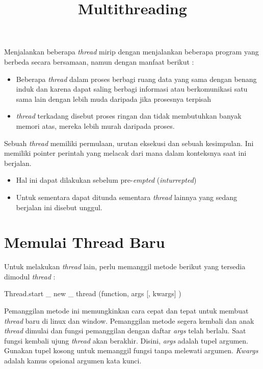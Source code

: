\documentclass [12pt,a4paper,notitlepage,oneside,bahasa]{article}
\begin{document}
\title{\textbf Multithreading}
\maketitle

Menjalankan beberapa\textit{ thread} mirip dengan menjalankan beberapa program yang berbeda secara bersamaan, namun dengan manfaat berikut :
\begin{itemize}
	\item Beberapa \textit{thread} dalam proses berbagi ruang data yang sama dengan benang induk dan karena dapat saling berbagi informasi atau berkomunikasi satu sama lain dengan lebih muda daripada jika prosesnya terpisah \par
	\item \textit{thread} terkadang disebut proses ringan dan tidak membutuhkan banyak memori atas, mereka lebih murah daripada proses.
\end{itemize}

Sebuah \textit{thread} memiliki permulaan, urutan eksekusi dan sebuah kesimpulan. Ini memiliki pointer perintah yang melacak dari mana dalam konteksnya saat ini berjalan. \par
\begin{itemize}
	\item Hal ini dapat dilakukan sebelum pre-\textit{empted} (\textit{inturrepted})
	\item Untuk sementara dapat ditunda sementara \textit{thread} lainnya yang sedang berjalan ini disebut unggul. 
\end{itemize}
\noindent 
\section{Memulai Thread Baru}
\noindent 
\hspace*{0.5in} Untuk melakukan \textit{thread} lain, perlu memanggil metode berikut yang tersedia dimodul \textit{thread} :
\noindent 
\begin{center}{\fontsize{9pt}{9pt}\selectfont Thread.start  \_  new   \_  thread (function, args [, kwargs] )}\end{center}
Pemanggilan metode ini memungkinkan cara cepat dan tepat untuk membuat \textit{thread} baru di linux dan window.
Pemanggilan metode segera kembali dan anak  \textit{thread} dimulai dan fungsi pemanggilan dengan daftar \textit{args} telah berlalu. Saat fungsi kembali ujung \textit{thread} akan berakhir.
Disini, \textit{args }adalah tupel argumen. Gunakan tupel kosong untuk memanggil fungsi tanpa melewati argumen. \textit{Kwargs} adalah kamus opsional argumen kata kunci.
\noindent 
\par
\noindent 
\end{document}
